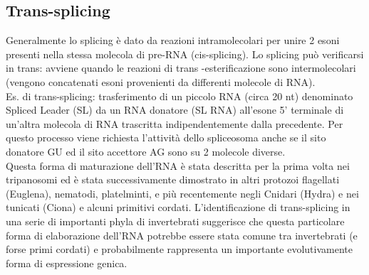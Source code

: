 \documentclass{article}
\begin{document}
\subsection{Trans-splicing}
Generalmente lo splicing è dato da reazioni intramolecolari per unire 2 esoni presenti nella stessa molecola
di pre-RNA (cis-splicing). Lo splicing può verificarsi in trans: avviene quando le reazioni di trans -esterificazione sono intermolecolari
(vengono concatenati esoni provenienti da differenti molecole di RNA).\\
Es. di trans-splicing: trasferimento di un piccolo RNA (circa 20 nt) denominato Spliced Leader (SL) da un
RNA donatore (SL RNA) all'esone 5' terminale di un'altra molecola di RNA trascritta indipendentemente
dalla precedente. Per questo processo viene richiesta l'attività dello spliceosoma anche se il sito donatore GU ed il sito
accettore AG sono su 2 molecole diverse.\\
Questa forma di maturazione dell'RNA è stata descritta per la prima volta nei tripanosomi ed è stata
successivamente dimostrato in altri protozoi flagellati (Euglena), nematodi, platelminti,
e più recentemente negli Cnidari (Hydra) e nei tunicati (Ciona) e alcuni primitivi
cordati. L'identificazione di trans-splicing in una serie di importanti phyla di invertebrati
suggerisce che questa particolare forma di elaborazione dell'RNA potrebbe essere stata comune tra
invertebrati (e forse primi cordati) e probabilmente rappresenta un importante evolutivamente
forma di espressione genica.
\end{document}
